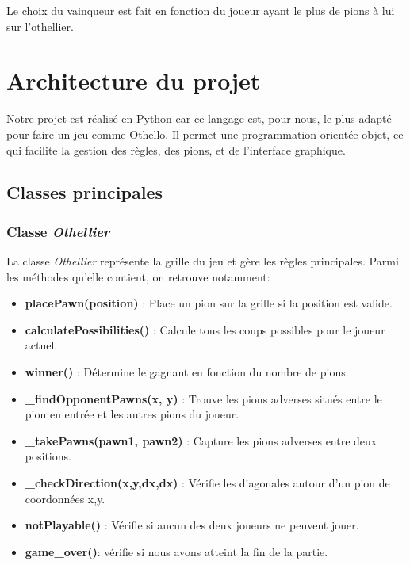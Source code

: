 \documentclass[a4paper,12pt]{article}
\begin{document}
Le choix du vainqueur est fait en fonction du joueur ayant le plus de pions à lui sur l'othellier.

\section{Architecture du projet}
Notre projet est réalisé en Python car ce langage est, pour nous, le plus adapté pour faire un jeu comme Othello. Il permet une programmation orientée objet, ce qui facilite la gestion des règles, des pions, et de l'interface graphique.

\subsection{Classes principales}
\subsubsection{Classe \emph{Othellier}}
La classe \emph{Othellier} représente la grille du jeu et gère les règles principales. Parmi les méthodes qu’elle contient, on retrouve notamment:
\begin{itemize}
    \item \textbf{placePawn(position)} : Place un pion sur la grille si la position est valide.
    \item \textbf{calculatePossibilities()} : Calcule tous les coups possibles pour le joueur actuel.
    \item \textbf{winner()} : Détermine le gagnant en fonction du nombre de pions.
    \item \textbf{\_findOpponentPawns(x, y)} : Trouve les pions adverses situés entre le pion en entrée et les autres pions du joueur.
    \item \textbf{\_takePawns(pawn1, pawn2)} : Capture les pions adverses entre deux positions.
    \item \textbf{\_checkDirection(x,y,dx,dx)} : Vérifie les diagonales autour d'un pion de coordonnées x,y.
    \item \textbf{notPlayable()} : Vérifie si aucun des deux joueurs ne peuvent jouer.
    \item \textbf {game\_over()}:
    vérifie si nous avons atteint la fin de la partie.
\end{itemize}
\end{document}
